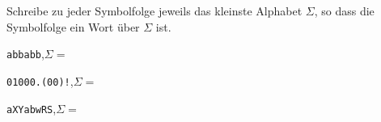 %
%
Schreibe zu jeder Symbolfolge jeweils das kleinste Alphabet \(\Sigma\), so dass die Symbolfolge ein Wort über \(\Sigma\) ist.
\begin{enumerate}[(a)]
{
    \item \texttt{abbabb},\hfill \(\Sigma = \)
    \item \texttt{01000.(00)!},\hfill \(\Sigma = \)
    \item \texttt{aXYabwRS},\hfill \(\Sigma = \)

}
\end{enumerate}

